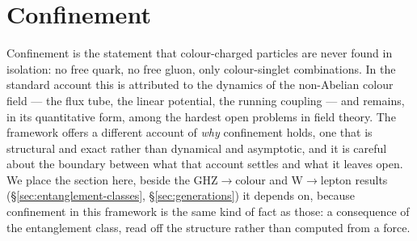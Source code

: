 %

\section{Confinement}
\label{sec:confinement}

Confinement is the statement that colour-charged particles are never found in isolation: no free
quark, no free gluon, only colour-singlet combinations. In the standard account this is attributed
to the dynamics of the non-Abelian colour field --- the flux tube, the linear potential, the running
coupling --- and remains, in its quantitative form, among the hardest open problems in field theory.
The framework offers a different account of \emph{why} confinement holds, one that is structural and
exact rather than dynamical and asymptotic, and it is careful about the boundary between what that
account settles and what it leaves open. We place the section here, beside the GHZ$\to$colour and
W$\to$lepton results (\S\ref{sec:entanglement-classes}, \S\ref{sec:generations}) it depends on,
because confinement in this framework is the same kind of fact as those: a consequence of the
entanglement class, read off the structure rather than computed from a force.

